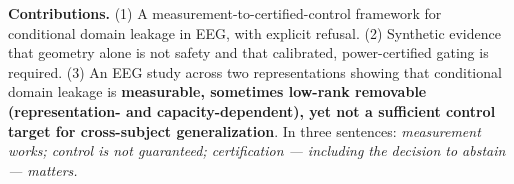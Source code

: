 \textbf{Contributions.} (1) A measurement-to-certified-control framework for conditional domain leakage in EEG,
with explicit refusal. (2) Synthetic evidence that geometry alone is not safety and that calibrated,
power-certified gating is required. (3) An EEG study across two representations showing that conditional
domain leakage is \textbf{measurable, sometimes low-rank removable (representation- and capacity-dependent), yet
not a sufficient control target for cross-subject generalization}. In three sentences: \emph{measurement works;
control is not guaranteed; certification --- including the decision to abstain --- matters.}
